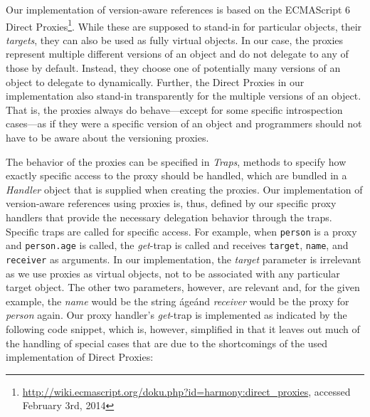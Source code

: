 
Our implementation of version-aware references is based on the ECMAScript 6 Direct Proxies\footnote{\url{http://wiki.ecmascript.org/doku.php?id=harmony:direct_proxies}, accessed February 3rd, 2014}.
While these are supposed to stand-in for particular objects, their \emph{targets}, they can also be used as fully virtual objects.
In our case, the proxies represent multiple different versions of an object and do not delegate to any of those by default.
Instead, they choose one of potentially many versions of an object to delegate to dynamically.
Further, the Direct Proxies in our implementation also stand-in transparently for the multiple versions of an object.
That is, the proxies always do behave---except for some specific introspection cases---as if they were a specific version of an object and programmers should not have to be aware about the versioning proxies.

The behavior of the proxies can be specified in \emph{Traps}, methods to specify how exactly specific access to the proxy should be handled, which are bundled in a \emph{Handler} object that is supplied when creating the proxies.
Our implementation of version-aware references using proxies is, thus, defined by our specific proxy handlers that provide the necessary delegation behavior through the traps.
Specific traps are called for specific access. 
For example, when \lstinline{person} is a proxy and \lstinline{person.age} is called, the \emph{get}-trap is called and receives \lstinline{target}, \lstinline{name}, and \lstinline{receiver} as arguments.
In our implementation, the \emph{target} parameter is irrelevant as we use proxies as virtual objects, not to be associated with any particular target object.
The other two parameters, however, are relevant and, for the given example, the \emph{name} would be the string \'age\' and \emph{receiver} would be the proxy for \emph{person} again.
Our proxy handler's \emph{get}-trap is implemented as indicated by the following code snippet, which is, however, simplified in that it leaves out much of the handling of special cases that are due to the shortcomings of the used implementation of Direct Proxies:


